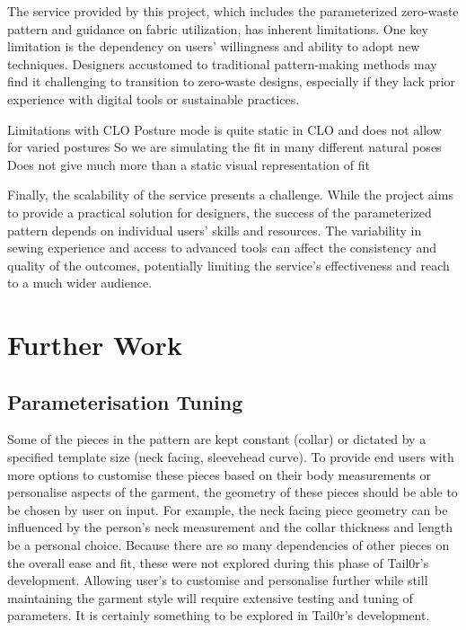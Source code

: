 The service provided by this project, which includes the parameterized zero-waste pattern and guidance on fabric utilization, has inherent limitations. One key limitation is the dependency on users’ willingness and ability to adopt new techniques. Designers accustomed to traditional pattern-making methods may find it challenging to transition to zero-waste designs, especially if they lack prior experience with digital tools or sustainable practices.

Limitations with CLO
Posture mode is quite static in CLO and does not allow for varied postures
So we are simulating the fit in many different natural poses
Does not give much more than a static visual representation of fit

Finally, the scalability of the service presents a challenge. While the project aims to provide a practical solution for designers, the success of the parameterized pattern depends on individual users’ skills and resources. The variability in sewing experience and access to advanced tools can affect the consistency and quality of the outcomes, potentially limiting the service’s effectiveness and reach to a much wider audience.

\section{Further Work}

\subsection{Parameterisation Tuning}
Some of the pieces in the pattern are kept constant (collar) or dictated by a specified template size (neck facing, sleevehead curve). To provide end users with more options to customise these pieces based on their body measurements or personalise aspects of the garment, the geometry of these pieces should be able to be chosen by user on input. For example, the neck facing piece geometry can be influenced by the person's neck measurement and the collar thickness and length be a personal choice. Because there are so many dependencies of other pieces on the overall ease and fit, these were not explored during this phase of Tail0r's development. Allowing user's to customise and personalise further while still maintaining the garment style will require extensive testing and tuning of parameters. It is certainly something to be explored in Tail0r's development.

